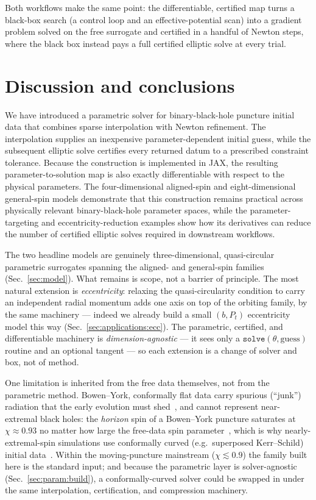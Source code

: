 \documentclass[
  aps,
  prd,
  twocolumn,
  amsmath,
  amssymb,
  nofootinbib,
  superscriptaddress,
  floatfix,
]{revtex4-2}
\begin{document}
Both workflows make the same point: the differentiable, certified map turns a
black-box search (a control loop and an effective-potential scan) into a gradient
problem solved on the free surrogate and certified in a handful of Newton steps,
where the black box instead pays a full certified elliptic solve at every trial.

\section{Discussion and conclusions}
\label{sec:conclusions}
We have introduced a parametric solver for binary-black-hole puncture initial data
that combines sparse interpolation with Newton refinement. The interpolation
supplies an inexpensive parameter-dependent initial guess, while the subsequent
elliptic solve certifies every returned datum to a prescribed constraint tolerance.
Because the construction is implemented in JAX, the resulting parameter-to-solution
map is also exactly differentiable with respect to the physical parameters. The
four-dimensional aligned-spin and eight-dimensional general-spin models demonstrate
that this construction remains practical across physically relevant
binary-black-hole parameter spaces, while the parameter-targeting and
eccentricity-reduction examples show how its derivatives can reduce the number of
certified elliptic solves required in downstream workflows.

The two headline models are genuinely three-dimensional, quasi-circular parametric
surrogates spanning the aligned- and general-spin families (Sec.~\ref{sec:model}).
What remains is scope, not a barrier of principle. The most natural extension is
\emph{eccentricity}: relaxing the quasi-circularity condition to carry an
independent radial momentum adds one axis on top of the orbiting family, by the same
machinery --- indeed we already build a small $(b,P_t)$ eccentricity model this way
(Sec.~\ref{sec:applications:ecc}). The parametric, certified, and differentiable
machinery is \emph{dimension-agnostic} --- it sees only a
$\texttt{solve}(\theta,\text{guess})$ routine and an optional tangent --- so each
extension is a change of solver and box, not of method.

One limitation is inherited from the free data themselves, not from the
parametric method. Bowen--York, conformally flat data carry spurious (``junk'')
radiation that the early evolution must shed~\cite{Lovelace2009}, and cannot
represent near-extremal black holes: the \emph{horizon} spin of a Bowen--York
puncture saturates at $\chi\approx0.93$ no matter how large the free-data spin
parameter~\cite{CookYork1990,DainLoustoZlochower2008}, which is why
nearly-extremal-spin simulations use conformally curved (e.g.\ superposed
Kerr--Schild) initial data~\cite{Lovelace2008}. Within the moving-puncture
mainstream ($\chi\lesssim0.9$) the family built here is the standard input; and
because the parametric layer is solver-agnostic
(Sec.~\ref{sec:param:build}), a conformally-curved solver could be swapped in
under the same interpolation, certification, and compression machinery.
\end{document}
